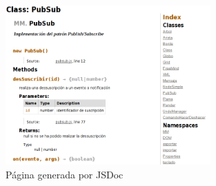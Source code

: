 \begin{figure}[htbp]
\centering
\includegraphics[width=0.7\textwidth]{imagenes/jsdoc}
\caption{Página generada por JSDoc}
\label{fig:jsdoc}
\end{figure}

